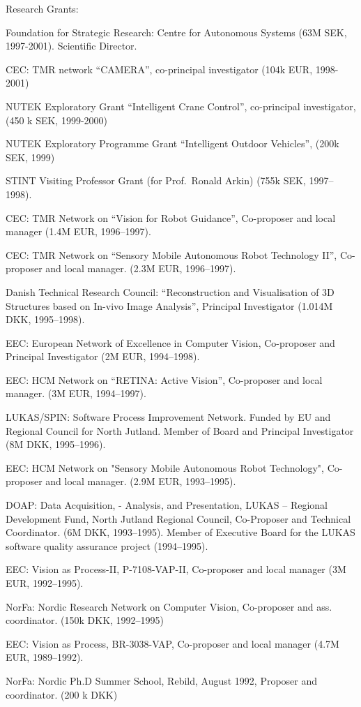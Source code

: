 \documentclass{article}
\begin{document}
\begin{cv}
\begin{cvlist}{Research Grants:}
\item Foundation for Strategic Research: Centre for Autonomous Systems
  (63M SEK, 1997-2001). Scientific Director.%
\item CEC: TMR network ``CAMERA'', co-principal investigator  (104k
  EUR, 1998-2001)%
\item NUTEK Exploratory Grant ``Intelligent Crane Control'',
  co-principal investigator, (450 k SEK, 1999-2000)%
\item NUTEK Exploratory Programme Grant ``Intelligent Outdoor
  Vehicles'', (200k SEK, 1999)%
\item STINT Visiting Professor Grant (for Prof.\ Ronald Arkin)  (755k
  SEK, 1997--1998).%
\item CEC: TMR Network on ``Vision for Robot Guidance'', Co-proposer
  and local manager (1.4M EUR, 1996--1997).%
\item CEC: TMR Network on ``Sensory Mobile Autonomous Robot Technology
  II'', Co-proposer and local manager.  (2.3M EUR, 1996--1997).%
\item Danish Technical Research Council: ``Reconstruction and
  Visualisation of 3D Structures based on In-vivo Image Analysis'',
  Principal Investigator (1.014M DKK, 1995--1998).%
\item EEC: European Network of Excellence in Computer Vision,
  Co-proposer and Principal Investigator (2M EUR, 1994--1998).%
\item EEC: HCM Network on ``RETINA: Active Vision'', Co-proposer and
  local manager.  (3M EUR, 1994--1997).%
\item LUKAS/SPIN: Software Process Improvement Network. Funded by EU
  and Regional Council for North Jutland. Member of Board and
  Principal Investigator (8M DKK, 1995--1996).%
\item EEC: HCM Network on "Sensory Mobile Autonomous Robot
  Technology", Co-proposer and local manager.  (2.9M EUR,
  1993--1995).%
\item DOAP: Data Acquisition, - Analysis, and Presentation, LUKAS --
  Regional Development Fund, North Jutland Regional Council,
  Co-Proposer and Technical Coordinator. (6M DKK, 1993--1995). Member
  of  Executive Board for the LUKAS software quality assurance project
  (1994--1995).%
\item EEC: Vision as Process-II, P-7108-VAP-II, Co-proposer and local
  manager (3M EUR, 1992--1995).%
\item NorFa: Nordic Research Network on Computer Vision, Co-proposer
  and ass. coordinator.  (150k DKK, 1992--1995)%
\item EEC: Vision as Process, BR-3038-VAP, Co-proposer and local
  manager (4.7M EUR, 1989--1992).%
\item NorFa: Nordic Ph.D Summer School, Rebild, August 1992, Proposer
  and coordinator. (200 k DKK)%
\end{cvlist}


\end{cv}
\end{document}

